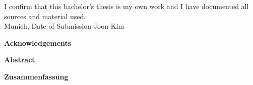 \documentclass[11pt,
               a4paper,
               bibtotoc,
               idxtotoc,
               headsepline,
               footsepline,
               footexclude,
               BCOR12mm,
               DIV13,
               openany,   %
               ]
               {scrbook}
\def\doctype{Bachelor's Thesis\xspace}
\def\author{Joon Kim}
\def\date{Date of Submission}
\begin{document}
\addtolength{\hoffset}{\bcorcor}
\newpage


\cleardoubleemptypage

\thispagestyle{empty}
\vspace*{0.7\textheight}
\noindent
I confirm that this \MakeLowercase{\doctype} is my own work and I have documented all sources and material used.\\

\vspace{15mm}
\noindent
Munich, \date \hspace{5cm} \author
\cleardoubleemptypage


{}
\vspace*{2cm}
\begin{center}
    {\Large \bf Acknowledgements}
\end{center}
\vspace{1cm}

\lipsum[1]

\cleardoublepage


{}
\vspace*{2cm}
\begin{center}
    {\Large \bf Abstract}
\end{center}
\vspace{1cm}

\lipsum[2]

\cleardoublepage

{}
\vspace*{2cm}
\begin{center}
    {\Large \bf Zusammenfassung}
\end{center}
\vspace{1cm}
\end{document}
